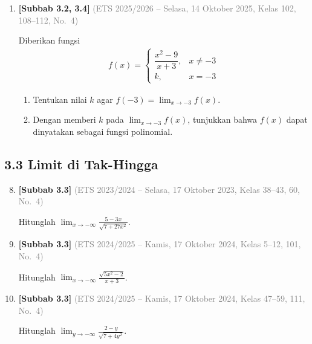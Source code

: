 \documentclass[10pt,openany,a4paper]{article}
\theoremstyle{definition}
\theoremstyle{definition}
\theoremstyle{plain}
\begin{document}
\begin{enumerate}
    \item \textbf{[Subbab 3.2, 3.4]} {\footnotesize\textcolor{gray}{(ETS 2025/2026 -- Selasa, 14 Oktober 2025, Kelas 102, 108--112, No.~4)}}\par
    Diberikan fungsi
    \begin{align*}
        f(x)=\begin{cases}
            \dfrac{x^2-9}{x+3}, &x\neq -3\\
            k, &x=-3
        \end{cases}
    \end{align*}
    \begin{enumerate}
        \item Tentukan nilai $k$ agar $f(-3)=\displaystyle\lim_{x\to -3} f(x)$.
        \item Dengan memberi $k$ pada $\displaystyle\lim_{x\to-3} f(x)$, tunjukkan bahwa $f(x)$ dapat dinyatakan sebagai fungsi polinomial.
    \end{enumerate}

\end{enumerate}
\subsection*{3.3 \quad Limit di Tak-Hingga}
\begin{enumerate}
\setcounter{enumi}{7}
    \item \textbf{[Subbab 3.3]} {\footnotesize\textcolor{gray}{(ETS 2023/2024 -- Selasa, 17 Oktober 2023, Kelas 38--43, 60, No.~4)}}\par
    Hitunglah $\displaystyle\lim_{x\to-\infty}\frac{5-3x}{\sqrt{7+27x^2}}$.

    \item \textbf{[Subbab 3.3]} {\footnotesize\textcolor{gray}{(ETS 2024/2025 -- Kamis, 17 Oktober 2024, Kelas 5--12, 101, No.~4)}}\par
    Hitunglah $\displaystyle\lim_{x\to-\infty}\frac{\sqrt{5x^2-2}}{x+3}$.

    \item \textbf{[Subbab 3.3]} {\footnotesize\textcolor{gray}{(ETS 2024/2025 -- Kamis, 17 Oktober 2024, Kelas 47--59, 111, No.~4)}}\par
    Hitunglah $\displaystyle\lim_{y\to-\infty}\frac{2-y}{\sqrt{7+4y^2}}$.

\end{enumerate}
\end{document}
